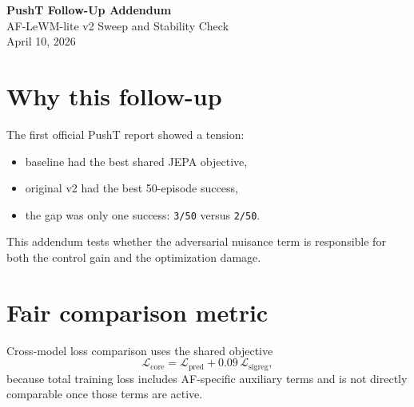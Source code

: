 \documentclass[11pt]{article}
\begin{document}
\color{ink}

{\sffamily
\begin{center}
  {\Large\bfseries PushT Follow-Up Addendum}\\[0.3em]
  {\large AF-LeWM-lite v2 Sweep and Stability Check}\\[0.4em]
  {\small April 10, 2026}
\end{center}
}


\section*{Why this follow-up}
The first official PushT report showed a tension:
\begin{itemize}[leftmargin=1.2em, itemsep=0.2em, topsep=0.2em]
  \item baseline had the best shared JEPA objective,
  \item original v2 had the best 50-episode success,
  \item the gap was only one success: \texttt{3/50} versus \texttt{2/50}.
\end{itemize}

This addendum tests whether the adversarial nuisance term is responsible for both the control gain and the optimization damage.

\section*{Fair comparison metric}
Cross-model loss comparison uses the shared objective
\[
\mathcal{L}_{\mathrm{core}} = \mathcal{L}_{\mathrm{pred}} + 0.09\,\mathcal{L}_{\mathrm{sigreg}},
\]
because total training loss includes AF-specific auxiliary terms and is not directly comparable once those terms are active.
\end{document}
